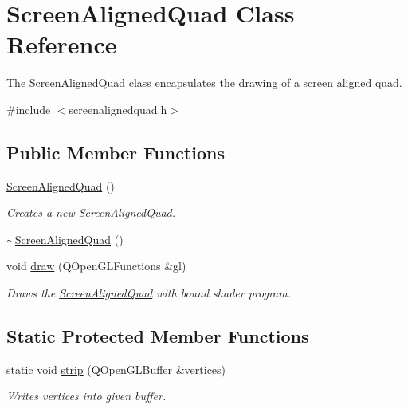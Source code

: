 \hypertarget{class_screen_aligned_quad}{\section{Screen\+Aligned\+Quad Class Reference}
\label{class_screen_aligned_quad}
}


The \hyperlink{class_screen_aligned_quad}{Screen\+Aligned\+Quad} class encapsulates the drawing of a screen aligned quad.  




{\ttfamily \#include $<$screenalignedquad.\+h$>$}

\subsection*{Public Member Functions}
\begin{DoxyCompactItemize}
\item 
\hyperlink{class_screen_aligned_quad_a630c0116c0487eb2f20b16464bfaa3fb}{Screen\+Aligned\+Quad} ()
\begin{DoxyCompactList}\small\item\em Creates a new \hyperlink{class_screen_aligned_quad}{Screen\+Aligned\+Quad}. \end{DoxyCompactList}\item 
\hyperlink{class_screen_aligned_quad_a71ac9f1f3378bcaa1e4a379a7ea00bb8}{$\sim$\+Screen\+Aligned\+Quad} ()
\item 
void \hyperlink{class_screen_aligned_quad_ac288d2712b9846afb5077af53b454761}{draw} (Q\+Open\+G\+L\+Functions \&gl)
\begin{DoxyCompactList}\small\item\em Draws the \hyperlink{class_screen_aligned_quad}{Screen\+Aligned\+Quad} with bound shader program. \end{DoxyCompactList}\end{DoxyCompactItemize}
\subsection*{Static Protected Member Functions}
\begin{DoxyCompactItemize}
\item 
static void \hyperlink{class_screen_aligned_quad_a103c649c457d5fcaf90d3f8ed4b7e208}{strip} (Q\+Open\+G\+L\+Buffer \&vertices)
\begin{DoxyCompactList}\small\item\em Writes vertices into given buffer. \end{DoxyCompactList}\end{DoxyCompactItemize}


